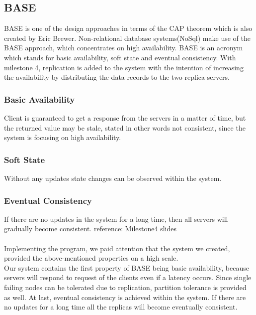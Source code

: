 \subsection{BASE}
\label{sec:backgorund_base}
BASE is one of the design approaches in terms of the CAP theorem which is also created by Eric Brewer. Non-relational database systems(NoSql) make use of the BASE approach, which concentrates on high availability. BASE is an acronym which stands for basic availability, soft state and eventual consistency. With milestone 4, replication is added to the system with the intention of increasing the availability by distributing the data records to the two replica servers.

\subsubsection{Basic Availability}
\label{sec:backgorund_base_basicavailability}
Client is guaranteed to get a response from the servers in a matter of time, but the returned value may be stale, stated in other words not consistent, since the system is focusing on high availability.
\subsubsection{Soft State}
\label{sec:backgorund_base_softstate}
Without any updates state changes can be observed within the system.
\subsubsection{Eventual Consistency}
\label{sec:backgorund_base_eventualconsistency}
If there are no updates in the system for a long time, then all servers will gradually become consistent. reference: Milestone4 slides\\
\\
Implementing the program, we paid attention that the system we created, provided the above-mentioned properties on a high scale.\\Our system contains the first property of BASE being basic availability, because servers will respond to request of the clients even if a latency occurs. Since single failing nodes can be tolerated due to replication, partition tolerance is provided as well. At last, eventual consistency is achieved within the system. If there are no updates for a long time all the replicas will become eventually consistent.

    


